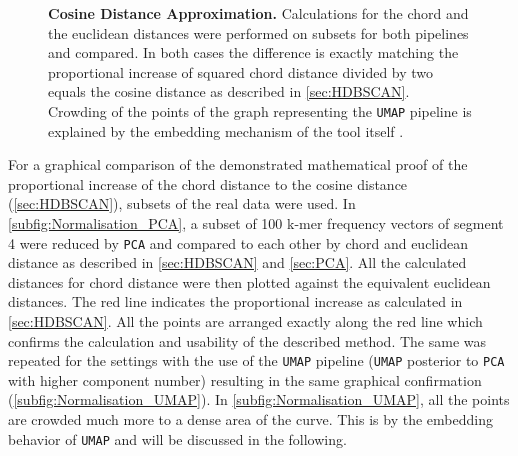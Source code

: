\begin{figure}[!hbt]
\begin{subfigure}[b]{0.475\textwidth}
    \end{subfigure}
    \caption[Cosine Distance Approximation]{\textbf{Cosine Distance Approximation.} Calculations for the chord and the euclidean distances were performed on subsets for both pipelines and compared. In both cases the difference is exactly matching the proportional increase of squared chord distance divided by two equals the cosine distance as described in \autoref{sec:HDBSCAN}. Crowding of the points of the graph representing the \texttt{UMAP} pipeline is explained by the embedding mechanism of the tool itself \autocite{mcinnes_umap_2020}.}
    \label{fig:Normalisation_Methods}
\end{figure}

For a graphical comparison of the demonstrated mathematical proof of the proportional increase of the chord distance to the cosine distance (\autoref{sec:HDBSCAN}), subsets of the real data were used. In \autoref{subfig:Normalisation_PCA}, a subset of 100 k-mer frequency vectors of segment 4 were reduced by \texttt{PCA} and compared to each other by chord and euclidean distance as described in \autoref{sec:HDBSCAN} and \autoref{sec:PCA}. All the calculated distances for chord distance were then plotted against the equivalent euclidean distances. The red line indicates the proportional increase as calculated in \autoref{sec:HDBSCAN}. All the points are arranged exactly along the red line which confirms the calculation and usability of the described method. The same was repeated for the settings with the use of the \texttt{UMAP} pipeline (\texttt{UMAP} posterior to \texttt{PCA} with higher component number) resulting in the same graphical confirmation (\autoref{subfig:Normalisation_UMAP}). In \autoref{subfig:Normalisation_UMAP}, all the points are crowded much more to a dense area of the curve. This is by the embedding behavior of \texttt{UMAP} and will be discussed in the following.











